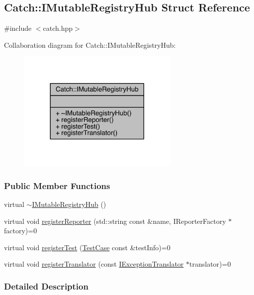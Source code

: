 \hypertarget{a00038}{}\subsection{Catch\+:\+:I\+Mutable\+Registry\+Hub Struct Reference}
\label{a00038}


{\ttfamily \#include $<$catch.\+hpp$>$}



Collaboration diagram for Catch\+:\+:I\+Mutable\+Registry\+Hub\+:\nopagebreak
\begin{figure}[H]
\begin{center}
\leavevmode
\includegraphics[width=221pt]{a00210}
\end{center}
\end{figure}
\subsubsection*{Public Member Functions}
\begin{DoxyCompactItemize}
\item 
virtual \hyperlink{a00038_a759ca1e044e19f905fb4d306f1367193}{$\sim$\+I\+Mutable\+Registry\+Hub} ()
\item 
virtual void \hyperlink{a00038_a1f61ed2b3f2d160b31a0f2c1d9a52af1}{register\+Reporter} (std\+::string const \&name, I\+Reporter\+Factory $\ast$factory)=0
\item 
virtual void \hyperlink{a00038_a11b85c6744d88c9f83fe16ad4a8dd451}{register\+Test} (\hyperlink{a00085}{Test\+Case} const \&test\+Info)=0
\item 
virtual void \hyperlink{a00038_ae6825365102693cf7707db022a2c2b49}{register\+Translator} (const \hyperlink{a00032}{I\+Exception\+Translator} $\ast$translator)=0
\end{DoxyCompactItemize}


\subsubsection{Detailed Description}


